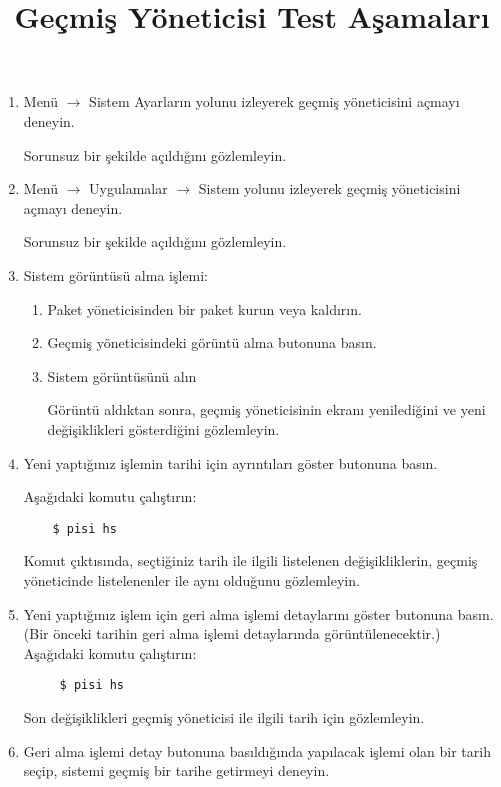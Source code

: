 \documentclass[a4paper,10pt]{article}
\title{Geçmiş Yöneticisi Test Aşamaları}
\begin{document}
\maketitle

\begin{enumerate}
\item Menü $\rightarrow$ Sistem Ayarların yolunu izleyerek geçmiş yöneticisini açmayı deneyin.

Sorunsuz bir şekilde açıldığını gözlemleyin.
\item Menü $\rightarrow$ Uygulamalar $\rightarrow$ Sistem yolunu izleyerek geçmiş yöneticisini açmayı deneyin.

Sorunsuz bir şekilde açıldığını gözlemleyin.
\item Sistem görüntüsü alma işlemi:
\begin{enumerate}
    \item Paket yöneticisinden bir paket kurun veya kaldırın.
    \item Geçmiş yöneticisindeki görüntü alma butonuna basın.
    \item Sistem görüntüsünü alın

   Görüntü aldıktan sonra, geçmiş yöneticisinin ekranı yenilediğini ve yeni değişiklikleri gösterdiğini gözlemleyin.
\end{enumerate}

\item Yeni yaptığınız işlemin tarihi için ayrıntıları göster butonuna basın.

    Aşağıdaki komutu çalıştırın:
\begin{verbatim}
    $ pisi hs
\end{verbatim} 

    Komut çıktısında, seçtiğiniz tarih ile ilgili listelenen değişikliklerin, geçmiş yöneticinde listelenenler ile aynı olduğunu gözlemleyin.

\item Yeni yaptığınız işlem için geri alma işlemi detaylarını göster butonuna basın. (Bir önceki tarihin geri alma işlemi detaylarında görüntülenecektir.)
    Aşağıdaki komutu çalıştırın:
\begin{verbatim}
     $ pisi hs
\end{verbatim} 
    Son değişiklikleri geçmiş yöneticisi ile ilgili tarih için gözlemleyin.


\item Geri alma işlemi detay butonuna basıldığında yapılacak işlemi olan bir tarih seçip, sistemi geçmiş bir tarihe getirmeyi deneyin. 


\end{enumerate}
\end{document}
